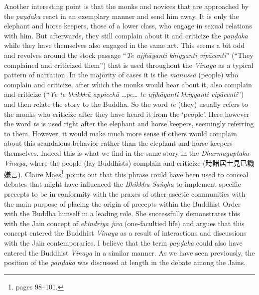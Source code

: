 Another interesting point is that the monks and novices that are approached by the {\em paṇḍaka} react in an exemplary manner and send him away. It is only the elephant and horse keepers, those of a lower class, who engage in sexual relations with him. But afterwards, they still complain about it and criticize the {\em paṇḍaka} while they have themselves also engaged in the same act. This seems a bit odd and revolves around the stock passage ``{\em Te ujjhāyanti khiyyanti vipācenti}'' (``They complained and criticized them'') that is used throughout the {\em Vinaya} as a typical pattern of narration. In the majority of cases it is the {\em manussā} (people) who complain and criticize, after which the monks would hear about it, also complain and criticize (``{\em Ye te bhikkhū appicchā …pe… te ujjhāyanti khiyyanti vipācenti}'') and then relate the story to the Buddha. So the word {\em te} (they) usually refers to the monks who criticize after they have heard it from the `people'. Here however the word {\em te} is used right after the elephant and horse keepers, seemingly referring to them. However, it would make much more sense if others would complain about this scandalous behavior rather than the elephant and horse keepers themselves. Indeed this is what we find in the same story in the {\em Dharmaguptaka} {\em Vinaya}, where the people (lay Buddhists) complain and criticize (時諸居士見已譏嫌言). Claire Maes\footnote{\cite{maes2011} pages 98–101.} points out that this phrase could have been used to conceal debates that might have influenced the {\em Bhikkhu Saṅgha} to implement specific precepts to be in conformity with the praxes of other ascetic communities with the main purpose of placing the origin of precepts within the Buddhist Order with the Buddha himself in a leading role. She successfully demonstrates this with the Jain concept of {\em ekindriya jīva} (one-facultied life) and argues that this concept entered the Buddhist {\em Vinaya} as a result of interactions and discussions with the Jain contemporaries. I believe that the term {\em paṇḍaka} could also have entered the Buddhist {\em Vinaya} in a similar manner. As we have seen previously, the position of the {\em paṇḍaka} was discussed at length in the debate among the Jains.

